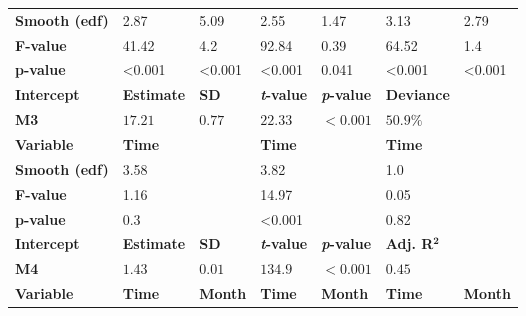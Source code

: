 \begin{table}[]
{\begin{tabular}{@{}lllllll@{}}
\textbf{Smooth (edf)} & \cellcolor{gray!50}2.87 & \cellcolor{gray!50}5.09 &\cellcolor{blue!25}2.55 & \cellcolor{blue!25}1.47 & \cellcolor{blue!50}3.13 & \cellcolor{blue!50}2.79 \\

\textbf{F-value} & \cellcolor{gray!50}41.42 & \cellcolor{gray!50}4.2 &\cellcolor{blue!25}92.84 & \cellcolor{blue!25}0.39 & \cellcolor{blue!50}64.52 & \cellcolor{blue!50}1.4 \\

\textbf{p-value} & \cellcolor{gray!50}<0.001 & \cellcolor{gray!50}<0.001 &\cellcolor{blue!25}<0.001 & \cellcolor{blue!25}0.041 & \cellcolor{blue!50}<0.001 & \cellcolor{blue!50}<0.001 \\
\midrule
\textbf{Intercept} & \textbf{Estimate} & \textbf{SD} & \textbf{\textit{t}-value} & \textbf{\textit{p}-value} & \textbf{Deviance} & \\
\textbf{M3} & $17.21$ & $0.77$ & $22.33$ & $<0.001$ & $50.9\%$ & \\
\midrule

\textbf{Variable} & \cellcolor{gray!50}\textbf{Time} & \cellcolor{gray!50} &\cellcolor{blue!25}\textbf{Time} & \cellcolor{blue!25} & \cellcolor{blue!50}\textbf{Time} & \cellcolor{blue!50} \\

\textbf{Smooth (edf)} & \cellcolor{gray!50}3.58 & \cellcolor{gray!50} &\cellcolor{blue!25}3.82 & \cellcolor{blue!25} & \cellcolor{blue!50}1.0 & \cellcolor{blue!50} \\

\textbf{F-value} & \cellcolor{gray!50}1.16 & \cellcolor{gray!50} &\cellcolor{blue!25}14.97 & \cellcolor{blue!25} & \cellcolor{blue!50}0.05 & \cellcolor{blue!50} \\

\textbf{p-value} & \cellcolor{gray!50}0.3 & \cellcolor{gray!50} &\cellcolor{blue!25}<0.001 & \cellcolor{blue!25} & \cellcolor{blue!50}0.82 & \cellcolor{blue!50} \\
\midrule

\textbf{Intercept} & \textbf{Estimate} & \textbf{SD} & \textbf{\textit{t}-value} & \textbf{\textit{p}-value} &  \textbf{Adj. R}$\mathbf{^{2}}$ & \\
\textbf{M4} & $1.43$ & $0.01$ & $134.9$ & $<0.001$ & $0.45$ & \\
\midrule

\textbf{Variable} & \cellcolor{gray!50}\textbf{Time} & \cellcolor{gray!50}\textbf{Month} &\cellcolor{blue!25}\textbf{Time} & \cellcolor{blue!25}\textbf{Month} & \cellcolor{blue!50}\textbf{Time} & \cellcolor{blue!50}\textbf{Month} \\


\end{tabular}}
\end{table}
